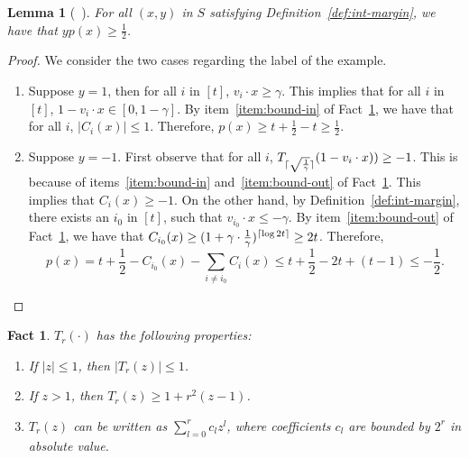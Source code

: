 \documentclass{article}
\DeclarePairedDelimiter\ceil{\lceil}{\rceil}
\newtheorem{lemma}[theorem]{Lemma}
\newtheorem{fact}[theorem]{Fact}
\begin{document}
\begin{lemma}[~\cite{klivans2004learning}]
For all $(x,y)$ in $S$ satisfying Definition~\ref{def:int-margin}, we have that $y p(x) \geq \frac 1 2$.
\end{lemma}
\begin{proof}
We consider the two cases regarding the label of the example.
\begin{enumerate}
\item Suppose $y = 1$, then for all $i$ in $[t]$, $v_i \cdot x \geq \gamma$. This implies that for all
$i$ in $[t]$, $1 - v_i \cdot x \in [0, 1-\gamma]$. By item~\ref{item:bound-in} of Fact~\ref{fact:cheb}, we have that for all $i$, $|C_i(x)| \leq 1$.
Therefore, $p(x) \geq t + \frac 1 2 - t \geq \frac 1 2$.

\item Suppose $y = -1$. First observe that for all $i$, $T_{\ceil{\sqrt{\frac 1 \gamma}}}(1 - v_i \cdot x)) \geq -1$. This is because of items~\ref{item:bound-in} and~\ref{item:bound-out} of Fact~\ref{fact:cheb}.
This implies that $C_i(x) \geq -1$.
On the other hand, by Definition~\ref{def:int-margin}, there exists an $i_0$ in $[t]$, such that $v_{i_0} \cdot x \leq -\gamma$. By item~\ref{item:bound-out} of Fact~\ref{fact:cheb}, we have that
$C_{i_0}(x) \geq (1 + \gamma \cdot \frac 1 \gamma)^{\ceil{\log 2t}} \geq 2t$. Therefore,
\[ p(x) = t + \frac 1 2 - C_{i_0}(x) - \sum_{i \neq i_0} C_i(x) \leq t + \frac 1 2 - 2t + (t-1) \leq -\frac 1 2. \]
\end{enumerate}
\end{proof}

\begin{fact}
$T_r(\cdot)$ has the following properties:
\begin{enumerate}
  \item If $|z| \leq 1$, then $|T_r(z)| \leq 1$. \label{item:bound-in}
  \item If $z > 1$, then $T_r(z) \geq 1 + r^2 (z-1)$. \label{item:bound-out}
  \item $T_r(z)$ can be written as $\sum_{l=0}^r c_l z^l$, where coefficients $c_l$ are bounded by $2^r$ in absolute value.
\end{enumerate}
\label{fact:cheb}
\end{fact}
\end{document}
